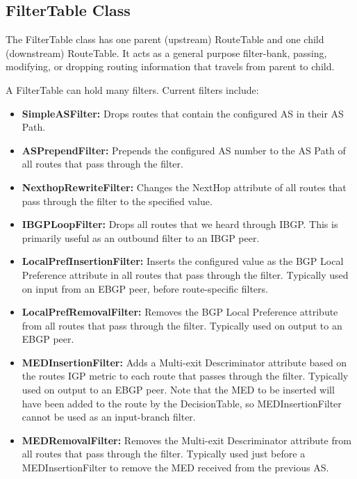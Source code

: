 \documentclass[11pt]{article}
\begin{document}
\subsection{FilterTable Class}

The FilterTable class has one parent (upstream) RouteTable and one
child (downstream) RouteTable.  It acts as a general purpose
filter-bank, passing, modifying, or dropping routing information that
travels from parent to child.

A FilterTable can hold many filters.  Current filters include:

\begin{itemize}

  \item {\bf SimpleASFilter:}  Drops routes that contain the configured
  AS in their AS Path.

  \item {\bf ASPrependFilter:} Prepends the configured AS number to the
  AS Path of all routes that pass through the filter.

  \item {\bf NexthopRewriteFilter:} Changes the NextHop attribute of all
  routes that pass through the filter to the specified value.

  \item {\bf IBGPLoopFilter:} Drops all routes that we heard through
  IBGP.  This is primarily useful as an outbound filter to an IBGP peer.

  \item {\bf LocalPrefInsertionFilter:} Inserts the configured value as
  the BGP Local Preference attribute in all routes that pass through the
  filter.  Typically used on input from an EBGP peer, before
  route-specific filters.

  \item {\bf LocalPrefRemovalFilter:} Removes the BGP Local Preference
  attribute from all routes that pass through the filter.  Typically
  used on output to an EBGP peer.

  \item {\bf MEDInsertionFilter:} Adds a Multi-exit Descriminator
  attribute based on the routes IGP metric to each route that passes
  through the filter.  Typically used on output to an EBGP peer.  Note
  that the MED to be inserted will have been added to the route by the
  DecisionTable, so MEDInsertionFilter cannot be used as an input-branch
  filter.

  \item {\bf MEDRemovalFilter:} Removes the  Multi-exit Descriminator
  attribute from all routes that pass through the filter.  Typically
  used just before a MEDInsertionFilter to remove the MED received from
  the previous AS.

\end{itemize}
\end{document}
